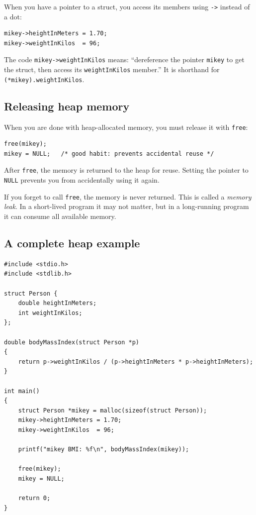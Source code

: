 When you have a pointer to a struct, you access its members using
\texttt{->} instead of a dot:

\begin{verbatim}
mikey->heightInMeters = 1.70;
mikey->weightInKilos  = 96;
\end{verbatim}

The code \texttt{mikey->weightInKilos} means: ``dereference the pointer
\texttt{mikey} to get the struct, then access its \texttt{weightInKilos}
member.''  It is shorthand for \texttt{(*mikey).weightInKilos}.

\subsection{Releasing heap memory}

When you are done with heap-allocated memory, you must release it with
\texttt{free}:

\begin{verbatim}
free(mikey);
mikey = NULL;   /* good habit: prevents accidental reuse */
\end{verbatim}

After \texttt{free}, the memory is returned to the heap for reuse.
Setting the pointer to \texttt{NULL} prevents you from accidentally
using it again.

If you forget to call \texttt{free}, the memory is never returned.
This is called a \emph{memory leak}.  In a
short-lived program it may not matter, but in a long-running program
it can consume all available memory.

\subsection{A complete heap example}

\begin{verbatim}
#include <stdio.h>
#include <stdlib.h>

struct Person {
    double heightInMeters;
    int weightInKilos;
};

double bodyMassIndex(struct Person *p)
{
    return p->weightInKilos / (p->heightInMeters * p->heightInMeters);
}

int main()
{
    struct Person *mikey = malloc(sizeof(struct Person));
    mikey->heightInMeters = 1.70;
    mikey->weightInKilos  = 96;

    printf("mikey BMI: %f\n", bodyMassIndex(mikey));

    free(mikey);
    mikey = NULL;

    return 0;
}
\end{verbatim}

